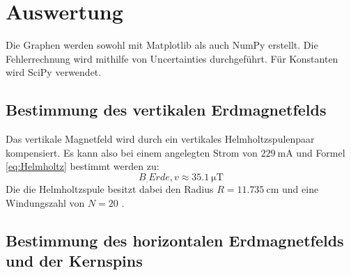\section{Auswertung}
\label{sec:Auswertung}

Die Graphen werden sowohl mit Matplotlib \cite{matplotlib} als auch NumPy \cite{numpy} erstellt. Die Fehlerrechnung wird mithilfe von Uncertainties \cite{uncertainties} durchgeführt. Für Konstanten wird SciPy \cite{scipy} verwendet.

\subsection{Bestimmung des vertikalen Erdmagnetfelds}

Das vertikale Magnetfeld wird durch ein vertikales Helmholtzspulenpaar kompensiert. Es kann also bei einem angelegten Strom von $\SI{229}{\milli\ampere}$ und Formel \ref{eq:Helmholtz} bestimmt werden zu:
\[
B_.{Erde,v} \approx \SI{35.1}{\micro\tesla}
\]
Die die Helmholtzspule besitzt dabei den Radius $R=\SI{11,735}{\centi\metre}$ und eine Windungszahl von $N=20$ \cite{V21}.

\subsection{Bestimmung des horizontalen Erdmagnetfelds und der Kernspins}

